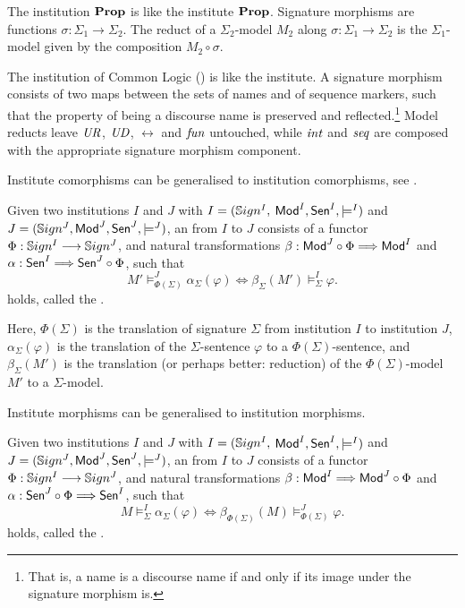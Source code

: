 \documentclass[%
\ifpretendfinal
final%
\else
draft%
\fi,
a4paper,
wd]{isov2}
\begin{document}
\begin{definition}\label{Prop}
The institution $\mathbf{Prop}$ is like the institute $\mathbf{Prop}$.
Signature morphisms are functions
$\sigma:{\Sigma_1}\to{\Sigma_2}$. The reduct of a $\Sigma_2$-model
$M_2$ along $\sigma:{\Sigma_1}\to{\Sigma_2}$ is the $\Sigma_1$-model
given by the composition $M_2\circ\sigma$. 
\end{definition}

\begin{definition}\label{CommonLogic}
The institution of Common Logic (\Clogic) is like the institute.
A \Clogic signature morphism consists of two maps
between the sets of names and of sequence markers, such that the property of being a discourse name
is preserved and reflected.\footnote{That is, a name is a discourse
name if and only if its image under the signature morphism is.}  
 Model reducts leave $\mathit{UR}$, $\mathit{UD}$, $\rel$ and $\mathit{fun}$
untouched, while $\mathit{int}$ and $\mathit{seq}$ are composed with the appropriate
signature morphism component.
\end{definition}
%

Institute comorphisms can be generalised to institution comorphisms,
see .  

\begin{definition} Given two institutions $I$ and $J$ with $I = (\mathbb{S}ign^I,$ $ \mathsf{Mod}^I, \mathsf{Sen}^I, \models^I)$ and $J = (\mathbb{S}ign^J, \mathsf{Mod}^J,
\mathsf{Sen}^J, \models^J)$, an  from $I$ to
$J$ consists of a functor $\Phi : \mathbb{S}ign^I \longrightarrow \mathbb{S}ign^J$, and
natural transformations $\beta: \mathsf{Mod}^J \circ \Phi \Longrightarrow \mathsf{Mod}^I$
and $\alpha: \mathsf{Sen}^I \Longrightarrow \mathsf{Sen}^J \circ \Phi$, such that 
$$ M'\models^{J}_{\Phi(\Sigma)}\alpha_{\Sigma}(\varphi) \Leftrightarrow
\beta_{\Sigma}(M')\models^I_{\Sigma}\varphi.
$$
holds, called the .
\end{definition}

\noindent
Here, $\Phi(\Sigma)$ is the translation of signature $\Sigma$ from
institution $I$ to institution $J$, $\alpha_{\Sigma}(\varphi)$ is the
translation of the $\Sigma$-sentence $\varphi$ to a
$\Phi(\Sigma)$-sentence, and $\beta_{\Sigma}(M')$ is the translation
(or perhaps better: reduction) of the $\Phi(\Sigma)$-model $M'$ to a
$\Sigma$-model.

Institute morphisms can be generalised to institution morphisms.

\begin{definition} Given two institutions $I$ and $J$ with $I = (\mathbb{S}ign^I,$ $ \mathsf{Mod}^I, \mathsf{Sen}^I, \models^I)$ and $J = (\mathbb{S}ign^J, \mathsf{Mod}^J,
\mathsf{Sen}^J, \models^J)$, an  from $I$ to
$J$ consists of a functor $\Phi : \mathbb{S}ign^I \longrightarrow \mathbb{S}ign^J$, and
natural transformations $\beta: \mathsf{Mod}^I \Longrightarrow \mathsf{Mod}^J \circ \Phi$
and $\alpha:  \mathsf{Sen}^J \circ \Phi \Longrightarrow \mathsf{Sen}^I $, such that 
$$ M\models^{I}_{\Sigma}\alpha_{\Sigma}(\varphi) \Leftrightarrow
\beta_{\Phi(\Sigma)}(M)\models^J_{\Phi(\Sigma)}\varphi.
$$
holds, called the .
\end{definition}
\end{document}
